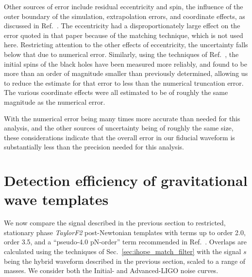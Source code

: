 Other sources of error include residual eccentricity and spin, the
influence of the outer boundary of the simulation, extrapolation
errors, and coordinate effects, as discussed in Ref.~\cite{Boyle2007}.
The eccentricity had a disproportionately large effect on the error
quoted in that paper because of the matching technique, which is not
used here.  Restricting attention to the other effects of
eccentricity, the uncertainty falls below that due to numerical error.
Similarly, using the techniques of Ref.~\cite{Lovelace2008}, the
initial spins of the black holes have been measured more reliably, and
found to be more than an order of magnitude smaller than previously
determined, allowing us to reduce the estimate for that error to less
than the numerical truncation error.  The various coordinate effects
were all estimated to be of roughly the same magnitude as the
numerical error.

With the numerical error being many times more accurate than needed
for this analysis, and the other sources of uncertainty being of
roughly the same size, these considerations indicate that the overall
error in our fiducial waveform is substantially less than the
precision needed for this analysis.


\section{Detection efficiency of gravitational wave templates}
\label{sec:Efficiency} %

We now compare the signal described in the previous section to
restricted, stationary phase \textit{TaylorF2} post-Newtonian
templates with terms up to order 2.0, order 3.5, and a ``pseudo-4.0
pN-order'' term recommended in Ref.~\cite{Pan2007}.  Overlaps are
calculated using the techniques of Sec.~\ref{sec:ihope_match_filter}
with the signal $s$ being the hybrid waveform described in the
previous section, scaled to a range of masses.  We consider both the
Initial- and Advanced-LIGO noise curves.

